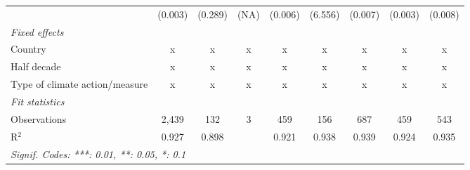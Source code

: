 \begin{table}[htbp]
\begin{tabular}{lcccccccc}
                                                                        & (0.003)       & (0.289)                   & (NA)         & (0.006)        & (6.556)          & (0.007)         & (0.003)         & (0.008)\\   
      \emph{Fixed effects}\\
      Country                                                           & x             & x                         & x            & x              & x                & x               & x               & x\\  
      Half decade                                                       & x             & x                         & x            & x              & x                & x               & x               & x\\  
      Type of climate action/measure                                    & x             & x                         & x            & x              & x                & x               & x               & x\\  
      \midrule \emph{Fit statistics}\\
      Observations                                                      & 2,439         & 132                       & 3            & 459            & 156              & 687             & 459             & 543\\  
      R$^2$                                                             & 0.927         & 0.898                     &              & 0.921          & 0.938            & 0.939           & 0.924           & 0.935\\  
      \midrule
      \multicolumn{9}{l}{\emph{Signif. Codes: ***: 0.01, **: 0.05, *: 0.1}}\\
   \end{tabular}
\end{table}


